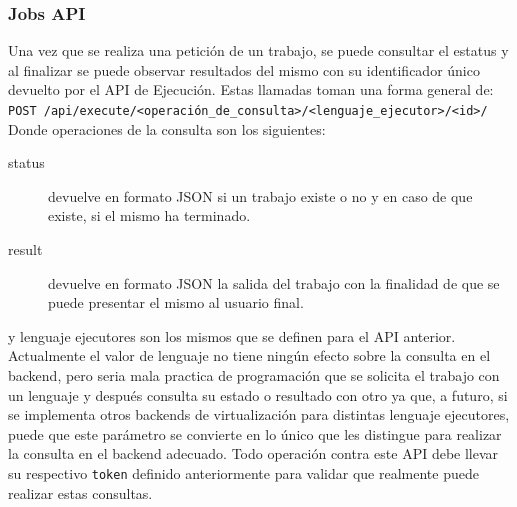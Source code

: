 \subsubsection{Jobs API}
Una vez que se realiza una petición de un trabajo, se puede consultar el estatus y al finalizar se puede observar resultados del mismo con su identificador único devuelto por el API de Ejecución. Estas llamadas toman una forma general de: \texttt{POST /api/execute/<operación\_de\_consulta>/<lenguaje\_ejecutor>/<id>/}
Donde operaciones de la consulta son los siguientes:
\begin{description}
	\item[status] devuelve en formato JSON si un trabajo existe o no y en caso de que existe, si el mismo ha terminado.
    \item[result] devuelve en formato JSON la salida del trabajo con la finalidad de que se puede presentar el mismo al usuario final.
\end{description}
y lenguaje ejecutores son los mismos que se definen para el API anterior. Actualmente el valor de lenguaje no tiene ningún efecto sobre la consulta en el backend, pero seria mala practica de programación que se solicita el trabajo con un lenguaje y después consulta su estado o resultado con otro ya que, a futuro, si se implementa otros backends de virtualización para distintas lenguaje ejecutores, puede que este parámetro se convierte en lo único que les distingue para realizar la consulta en el backend adecuado. Todo operación contra este API debe llevar su respectivo \texttt{token} definido anteriormente para validar que realmente puede realizar estas consultas.
